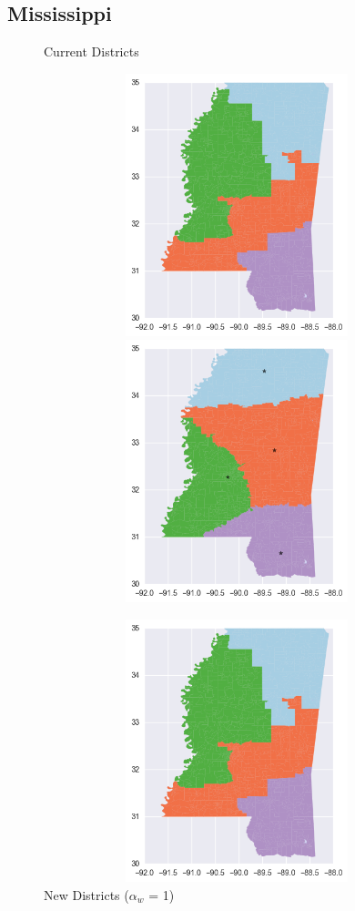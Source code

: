 \clearpage
\newpage

\subsection{Mississippi}
\begin{figure}[htb!] \centering
\caption{ Current Districts }
\includegraphics[width=5in,height=3in,keepaspectratio]{../maps/MS/static/before.png}
\includegraphics[width=5in,height=3in,keepaspectratio]{../maps/MS/static/0_0_after.png}
\caption{ New Districts ($\alpha_w$ = 1) }
\includegraphics[width=5in,height=3in,keepaspectratio]{../maps/MS/static/before.png}

\end{figure}
